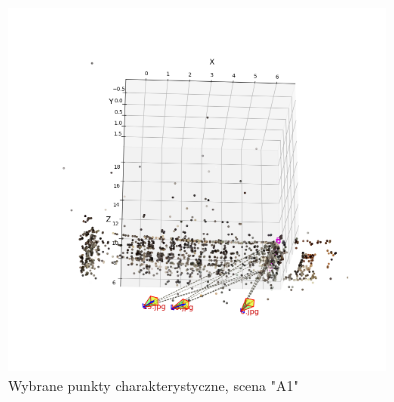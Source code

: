 \begin{figure}[h]
   \centering
   \includegraphics[width=10cm]{feature_A1/plot.png}
   \caption{Wybrane punkty charakterystyczne, scena "A1"}
   \label {fig:feature_A1_plot}
\end{figure}

